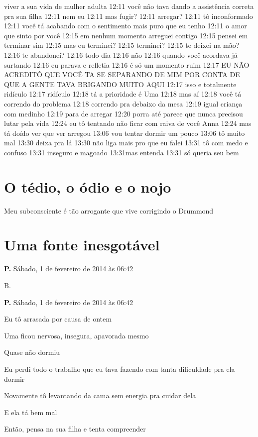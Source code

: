 viver a sua vida de mulher adulta 12:11 você não tava dando a
assistência correta pra sua filha 12:11 nem eu 12:11 mas fugir? 12:11
arregar? 12:11 tô inconformado 12:11 você tá acabando com o sentimento
mais puro que eu tenho 12:11 o amor que sinto por você 12:15 em nenhum
momento arreguei contigo 12:15 pensei em terminar sim 12:15 mas eu
terminei? 12:15 terminei? 12:15 te deixei na mão? 12:16 te abandonei?
12:16 todo dia 12:16 não 12:16 quando você acordava já surtando 12:16 eu
parava e refletia 12:16 é só um momento ruim 12:17 EU NÃO ACREDITÔ QUE
VOCÊ TA SE SEPARANDO DE MIM POR CONTA DE QUE A GENTE TAVA BRIGANDO MUITO
AQUI 12:17 isso e totalmente ridículo 12:17 ridículo 12:18 tá a
prioridade é Uma 12:18 mas aí 12:18 você tá correndo do problema 12:18
correndo pra debaixo da mesa 12:19 igual criança com medinho 12:19 para
de arregar 12:20 porra até parece que nunca precisou lutar pela vida
12:24 eu tô tentando não ficar com raiva de você Anna 12:24 mas tá doído
ver que ver arregou 13:06 vou tentar dormir um pouco 13:06 tô muito mal
13:30 deixa pra lá 13:30 não liga mais pro que eu falei 13:31 tô com
medo e confuso 13:31 inseguro e magoado 13:31mas entenda 13:31 só queria
seu bem

\chapter{O tédio, o ódio e o nojo}

Meu subconsciente é tão arrogante que vive corrigindo o Drummond

\chapter{Uma fonte inesgotável}

\textbf{P.} Sábado, 1 de fevereiro de 2014 às 06:42

B.

\textbf{P.} Sábado, 1 de fevereiro de 2014 às 06:42

Eu tô arrasada por causa de ontem

Uma ficou nervosa, insegura, apavorada mesmo

Quase não dormiu

Eu perdi todo o trabalho que eu tava fazendo com tanta dificuldade pra
ela dormir

Novamente tô levantando da cama sem energia pra cuidar dela

E ela tá bem mal

Então, pensa na sua filha e tenta compreender

